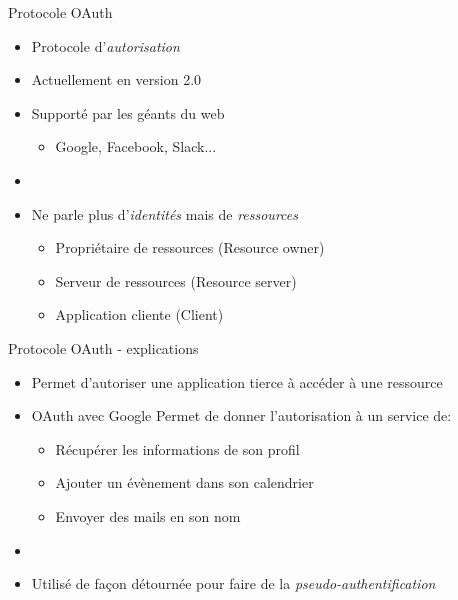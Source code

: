 \documentclass{beamer}
\begin{document}
\begin{frame}{Protocole OAuth}
  \begin{center}
    \begin{itemize}
      \item Protocole d'\emph{autorisation}
      \item Actuellement en version 2.0
      \item Supporté par les géants du web
      \begin{itemize}
        \item Google, Facebook, Slack...
      \end{itemize}
      \item[~]
      \item Ne parle plus d'\emph{identités} mais de \emph{ressources}
        \begin{itemize}
          \item Propriétaire de ressources (Resource owner)
          \item Serveur de ressources (Resource server)
          \item Application cliente (Client)
        \end{itemize}
    \end{itemize}
  \end{center}
\end{frame}

\begin{frame}{Protocole OAuth - explications}
  \begin{center}
    \begin{itemize}
      \item Permet d'autoriser une application tierce à accéder à une ressource
      \pause
      \item[~]
      \begin{exampleblock}{OAuth avec Google}
        Permet de donner l'autorisation à un service de:
        \pause
        \begin{itemize}
          \item Récupérer les informations de son profil
          \pause
          \item Ajouter un évènement dans son calendrier
          \pause
          \item Envoyer des mails en son nom
        \end{itemize}
      \end{exampleblock}
      \pause
      \item[~]
      \item Utilisé de façon détournée pour faire de la \emph{pseudo-authentification}
    \end{itemize}
  \end{center}
\end{frame}
\end{document}
